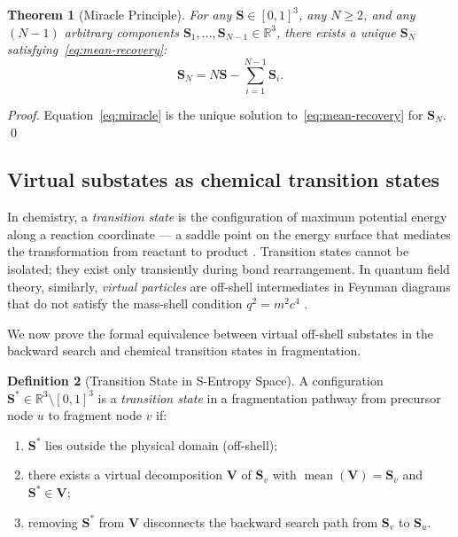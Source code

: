 \documentclass[twocolumn,10pt,a4paper]{article}
\theoremstyle{thmstyle}
\newtheorem{theorem}{Theorem}[section]
\theoremstyle{definition}
\newtheorem{definition}[theorem]{Definition}
\theoremstyle{remark}
\newcommand{\R}{\mathbb{R}}
\newcommand{\Sv}{\mathbf{S}}
\DeclareMathOperator{\mean}{mean}
\begin{document}
\begin{theorem}[Miracle Principle]
\label{thm:miracle}
For any $\Sv \in [0,1]^3$, any $N \geq 2$, and any $(N-1)$ arbitrary
components $\Sv_1, \ldots, \Sv_{N-1} \in \R^3$, there exists a unique
$\Sv_N$ satisfying~\eqref{eq:mean-recovery}:
\begin{equation}
\Sv_N = N\Sv - \sum_{i=1}^{N-1}\Sv_i.
\label{eq:miracle}
\end{equation}
\end{theorem}

\begin{proof}
Equation~\eqref{eq:miracle} is the unique solution to~\eqref{eq:mean-recovery}
for $\Sv_N$. \qed
\end{proof}

\subsection{Virtual substates as chemical transition states}

In chemistry, a \emph{transition state} is the configuration of maximum
potential energy along a reaction coordinate --- a saddle point on the
energy surface that mediates the transformation from reactant to product
\citep{peskin1995}. Transition states cannot be isolated; they exist only
transiently during bond rearrangement. In quantum field theory, similarly,
\emph{virtual particles} are off-shell intermediates in Feynman diagrams
that do not satisfy the mass-shell condition $q^2 = m^2c^4$
\citep{peskin1995}.

We now prove the formal equivalence between virtual off-shell substates
in the backward search and chemical transition states in fragmentation.

\begin{definition}[Transition State in S-Entropy Space]
\label{def:transition-state}
A configuration $\Sv^* \in \R^3 \setminus [0,1]^3$ is a
\emph{transition state} in a fragmentation pathway from precursor node
$u$ to fragment node $v$ if:
\begin{enumerate}[nosep,label=(\roman*)]
\item $\Sv^*$ lies outside the physical domain (off-shell);
\item there exists a virtual decomposition $\mathbf{V}$ of $\Sv_v$
  with $\mean(\mathbf{V}) = \Sv_v$ and $\Sv^* \in \mathbf{V}$;
\item removing $\Sv^*$ from $\mathbf{V}$ disconnects the backward
  search path from $\Sv_v$ to $\Sv_u$.
\end{enumerate}
\end{definition}
\end{document}

